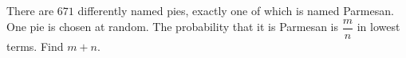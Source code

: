 There are $671$ differently named pies, exactly one of which is named Parmesan. One pie is chosen at random. The probability that it is Parmesan is $\dfrac mn$ in lowest terms. Find $m+n$.
